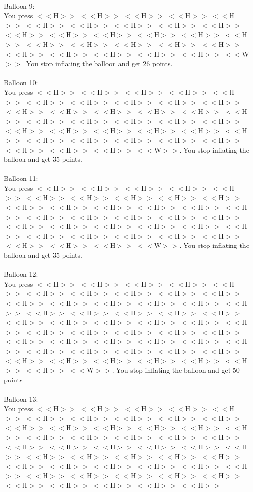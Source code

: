 \documentclass[pdflatex,sn-nature]{sn-jnl}%
\theoremstyle{thmstyleone}%
\theoremstyle{thmstyletwo}%
\theoremstyle{thmstylethree}%
\begin{document}
 $~$\\ 
Balloon 9: $~$\\ 
You press $<<$H$>>$ $<<$H$>>$ $<<$H$>>$ $<<$H$>>$ $<<$H$>>$ $<<$H$>>$ $<<$H$>>$ $<<$H$>>$ $<<$H$>>$ $<<$H$>>$ $<<$H$>>$ $<<$H$>>$ $<<$H$>>$ $<<$H$>>$ $<<$H$>>$ $<<$H$>>$ $<<$H$>>$ $<<$H$>>$ $<<$H$>>$ $<<$H$>>$ $<<$H$>>$ $<<$H$>>$ $<<$H$>>$ $<<$H$>>$ $<<$H$>>$ $<<$H$>>$ $<<$W$>>$. You stop inflating the balloon and get 26 points. $~$\\ 
 $~$\\ 
Balloon 10: $~$\\ 
You press $<<$H$>>$ $<<$H$>>$ $<<$H$>>$ $<<$H$>>$ $<<$H$>>$ $<<$H$>>$ $<<$H$>>$ $<<$H$>>$ $<<$H$>>$ $<<$H$>>$ $<<$H$>>$ $<<$H$>>$ $<<$H$>>$ $<<$H$>>$ $<<$H$>>$ $<<$H$>>$ $<<$H$>>$ $<<$H$>>$ $<<$H$>>$ $<<$H$>>$ $<<$H$>>$ $<<$H$>>$ $<<$H$>>$ $<<$H$>>$ $<<$H$>>$ $<<$H$>>$ $<<$H$>>$ $<<$H$>>$ $<<$H$>>$ $<<$H$>>$ $<<$H$>>$ $<<$H$>>$ $<<$H$>>$ $<<$H$>>$ $<<$H$>>$ $<<$W$>>$. You stop inflating the balloon and get 35 points. $~$\\ 
 $~$\\ 
Balloon 11: $~$\\ 
You press $<<$H$>>$ $<<$H$>>$ $<<$H$>>$ $<<$H$>>$ $<<$H$>>$ $<<$H$>>$ $<<$H$>>$ $<<$H$>>$ $<<$H$>>$ $<<$H$>>$ $<<$H$>>$ $<<$H$>>$ $<<$H$>>$ $<<$H$>>$ $<<$H$>>$ $<<$H$>>$ $<<$H$>>$ $<<$H$>>$ $<<$H$>>$ $<<$H$>>$ $<<$H$>>$ $<<$H$>>$ $<<$H$>>$ $<<$H$>>$ $<<$H$>>$ $<<$H$>>$ $<<$H$>>$ $<<$H$>>$ $<<$H$>>$ $<<$H$>>$ $<<$H$>>$ $<<$H$>>$ $<<$H$>>$ $<<$H$>>$ $<<$H$>>$ $<<$W$>>$. You stop inflating the balloon and get 35 points. $~$\\ 
 $~$\\ 
Balloon 12: $~$\\ 
You press $<<$H$>>$ $<<$H$>>$ $<<$H$>>$ $<<$H$>>$ $<<$H$>>$ $<<$H$>>$ $<<$H$>>$ $<<$H$>>$ $<<$H$>>$ $<<$H$>>$ $<<$H$>>$ $<<$H$>>$ $<<$H$>>$ $<<$H$>>$ $<<$H$>>$ $<<$H$>>$ $<<$H$>>$ $<<$H$>>$ $<<$H$>>$ $<<$H$>>$ $<<$H$>>$ $<<$H$>>$ $<<$H$>>$ $<<$H$>>$ $<<$H$>>$ $<<$H$>>$ $<<$H$>>$ $<<$H$>>$ $<<$H$>>$ $<<$H$>>$ $<<$H$>>$ $<<$H$>>$ $<<$H$>>$ $<<$H$>>$ $<<$H$>>$ $<<$H$>>$ $<<$H$>>$ $<<$H$>>$ $<<$H$>>$ $<<$H$>>$ $<<$H$>>$ $<<$H$>>$ $<<$H$>>$ $<<$H$>>$ $<<$H$>>$ $<<$H$>>$ $<<$H$>>$ $<<$H$>>$ $<<$H$>>$ $<<$H$>>$ $<<$W$>>$. You stop inflating the balloon and get 50 points. $~$\\ 
 $~$\\ 
Balloon 13: $~$\\ 
You press $<<$H$>>$ $<<$H$>>$ $<<$H$>>$ $<<$H$>>$ $<<$H$>>$ $<<$H$>>$ $<<$H$>>$ $<<$H$>>$ $<<$H$>>$ $<<$H$>>$ $<<$H$>>$ $<<$H$>>$ $<<$H$>>$ $<<$H$>>$ $<<$H$>>$ $<<$H$>>$ $<<$H$>>$ $<<$H$>>$ $<<$H$>>$ $<<$H$>>$ $<<$H$>>$ $<<$H$>>$ $<<$H$>>$ $<<$H$>>$ $<<$H$>>$ $<<$H$>>$ $<<$H$>>$ $<<$H$>>$ $<<$H$>>$ $<<$H$>>$ $<<$H$>>$ $<<$H$>>$ $<<$H$>>$ $<<$H$>>$ $<<$H$>>$ $<<$H$>>$ $<<$H$>>$ $<<$H$>>$ $<<$H$>>$ $<<$H$>>$ $<<$H$>>$ $<<$H$>>$ $<<$H$>>$ $<<$H$>>$ $<<$H$>>$ $<<$H$>>$ $<<$H$>>$ $<<$H$>>$ 
\end{document}
